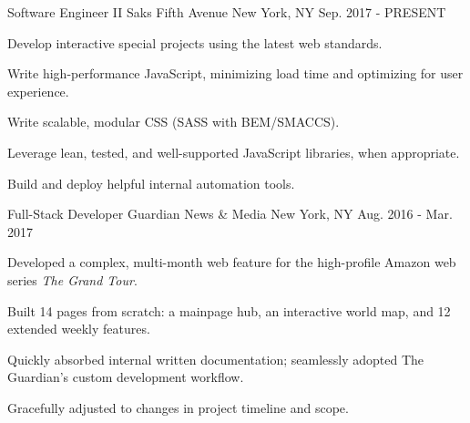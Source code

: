 

\begin{cventries}

  \cventry
    {Software Engineer II} %
    {Saks Fifth Avenue} %
    {New York, NY} %
    {Sep. 2017 - PRESENT} %
    {
      \begin{cvitems} %
       \item {Develop interactive special projects using the latest web standards.}
       \item {Write high-performance JavaScript, minimizing load time and optimizing for user experience.}
       \item {Write scalable, modular CSS (SASS with BEM/SMACCS).}
       \item {Leverage lean, tested, and well-supported JavaScript libraries, when appropriate.}
       \item {Build and deploy helpful internal automation tools.}
      \end{cvitems}
    }

  \cventry
    {Full-Stack Developer} %
    {Guardian News \& Media} %
    {New York, NY} %
    {Aug. 2016 - Mar. 2017} %
    {
      \begin{cvitems} %
        \item {Developed a complex, multi-month web feature for the high-profile Amazon web series \textit{The Grand Tour}.}
        \item {Built 14 pages from scratch: a mainpage hub, an interactive world map, and 12 extended weekly features.}
        \item {Quickly absorbed internal written documentation; seamlessly adopted The Guardian’s custom development workflow.}
        \item {Gracefully adjusted to changes in project timeline and scope.}
      \end{cvitems}
    }


\end{cventries}
